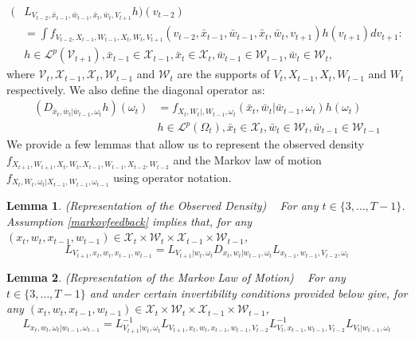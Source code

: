 \documentclass{article}
\newtheorem{lemma}{Lemma}[section]
\begin{document}
\begin{equation}\label{operator}
    \begin{split}
     (&L_{V_{t-2},\bar{x}_{t-1},\bar{w}_{t-1},\bar{x}_{t},\bar{w}_{t}, V_{t+1}}h)(v_{t-2})\\
     &=\int f_{V_{t-2}, X_{t-1}, W_{t-1}, X_{t}, W_{t}, V_{t+1}}(v_{t-2}, \bar{x}_{t-1}, \bar{w}_{t-1}, \bar{x}_{t}, \bar{w}_{t}, v_{t+1})h(v_{t+1})dv_{t+1}:\\
     &h\in \mathcal{L}^{p}(\mathcal{V}_{t+1}), \bar{x}_{t-1}\in \mathcal{X}_{t-1}, \bar{x}_{t}\in \mathcal{X}_{t}, \bar{w}_{t-1}\in \mathcal{W}_{t-1}, \bar{w}_{t}\in \mathcal{W}_{t},
    \end{split}
\end{equation}
where $\mathcal{V}_{t}, \mathcal{X}_{t-1}, \mathcal{X}_{t}, \mathcal{W}_{t-1}$ and $\mathcal{W}_{t}$ are the supports of $V_{t}, X_{t-1}, X_{t}, W_{t-1}$ and $W_{t}$ respectively. We also define the diagonal operator as:
\begin{equation}\label{diagonal}
    \begin{split}
        (D_{\bar{x}_{t}, \bar{w}_{t}|\bar{w}_{t-1}, \omega_{t}}h)(\omega_{t})&=f_{X_{t}, W_{t}|, W_{t-1}, \omega_{t}}(\bar{x}_{t}, \bar{w}_{t}|\bar{w}_{t-1}, \omega_{t})h(\omega_{t})\\
        &h\in \mathcal{L}^{p}(\Omega_{t}), \bar{x}_{t}\in \mathcal{X}_{t}, \bar{w}_{t}\in \mathcal{W}_{t}, \bar{w}_{t-1}\in \mathcal{W}_{t-1}
    \end{split}
\end{equation}
We provide a few lemmas that allow us to represent the observed density $f_{X_{t+1}, W_{t+1}, X_{t}, W_{t}, X_{t-1}, W_{t-1}, X_{t-2}, W_{t-2}}$ and the Markov law of motion $f_{X_{t}, W_{t}, \omega_{t}|X_{t-1}, W_{t-1}, \omega_{t-1}}$ using operator notation.

\begin{lemma} (Representation of the Observed Density)
~
For any $t\in\{3,\dots, T-1\}$. Assumption \eqref{markovfeedback} implies that, for any $(x_{t}, w_{t}, x_{t-1}, w_{t-1})\in \mathcal{X}_{t}\times \mathcal{W}_{t}\times \mathcal{X}_{t-1}\times \mathcal{W}_{t-1}$,
\begin{equation}\label{obsoperator}
L_{V_{t+1},x_{t}, w_{t}, x_{t-1}, w_{t-1}}=L_{V_{t+1}|w_{t}, \omega_{t}}D_{x_{t}, w_{t}|w_{t-1}, \omega_{t}}L_{x_{t-1}, w_{t-1}, V_{t-2}, \omega_{t}}
\end{equation}
\end{lemma}

\begin{lemma} (Representation of the Markov Law of Motion)
~
For any $t\in\{3,\dots, T-1\}$ and under certain invertibility conditions provided below give, for any $(x_{t}, w_{t}, x_{t-1}, w_{t-1})\in \mathcal{X}_{t}\times \mathcal{W}_{t}\times \mathcal{X}_{t-1}\times \mathcal{W}_{t-1}$,
\begin{equation}\label{markovoperator}
L_{x_{t},w_{t},\omega_{t}|w_{t-1},\omega_{t-1}}=L^{-1}_{V_{t+1}|w_{t},\omega_{t}}L_{V_{t+1},x_{t},w_{t},x_{t-1}, w_{t-1}, V_{t-2}}L^{-1}_{V_{t},x_{t-1},w_{t-1},V_{t-2}}L_{V_{t}|w_{t-1},\omega_{t}}
\end{equation}
\end{lemma}
\end{document}
